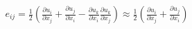 \documentclass[10pt]{article}
\begin{document}
\begin{align*}e_{ij}={\frac {1}{2}}\left({\frac {\partial u_{i}}{\partial x_{j}}}+{\frac {\partial u_{j}}{\partial x_{i}}}-{\frac {\partial u_{k}}{\partial x_{i}}}{\frac {\partial u_{k}}{\partial x_{j}}}\right)\approx {\frac {1}{2}}\left({\frac {\partial u_{i}}{\partial x_{j}}}+{\frac {\partial u_{j}}{\partial x_{i}}}\right)\end{align*}
\end{document}
